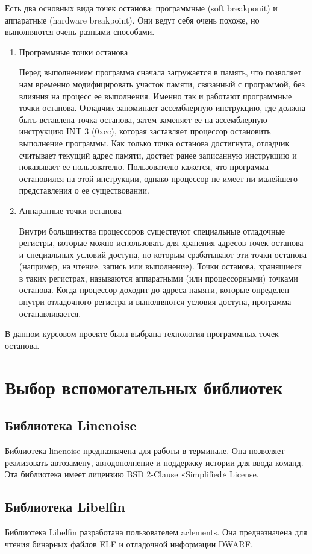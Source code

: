 \documentclass[oneside,final,14pt]{extreport}
\begin{document}
Есть два основных вида точек останова: программные (soft breakponit) и аппаратные (hardware breakpoint). Они ведут себя очень похоже, но выполняются очень разными способами.
\begin{enumerate}
	\item Программные точки останова
	
	Перед выполнением программа сначала загружается в память, что позволяет нам временно модифицировать участок памяти, связанный с программой, без влияния на процесс ее выполнения. Именно так и работают программные точки останова. Отладчик запоминает ассемблерную инструкцию, где должна быть вставлена точка останова, затем заменяет ее на ассемблерную инструкцию INT 3 (0xcc), которая заставляет процессор остановить выполнение программы. Как только точка останова достигнута, отладчик считывает текущий адрес памяти, достает ранее записанную инструкцию и показывает ее пользователю. Пользователю кажется, что программа остановился на этой инструкции, однако процессор не имеет ни малейшего представления о ее существовании.
	\item Аппаратные точки останова
	
	Внутри большинства процессоров существуют специальные отладочные регистры, которые можно использовать для хранения адресов точек останова и специальных условий доступа, по которым срабатывают эти точки останова (например, на чтение, запись или выполнение). Точки останова, хранящиеся в таких регистрах, называются аппаратными (или процессорными) точками останова. Когда процессор доходит до адреса памяти, которые определен внутри отладочного регистра и выполняются условия доступа, программа останавливается.
\end{enumerate}

В данном курсовом проекте была выбрана технология программных точек останова. 
\section {Выбор вспомогательных библиотек}
\subsection{Библиотека Linenoise}
Библиотека linenoise предназначена для работы в терминале. Она позволяет реализовать автозамену, автодополнение и поддержку истории для ввода команд. Эта библиотека имеет лицензию BSD 2-Clause «Simplified» License.
\subsection{Библиотека Libelfin}
Библиотека Libelfin разработана пользователем aclements.
Она предназначена для чтения бинарных файлов ELF и отладочной информации DWARF.
\end{document}
